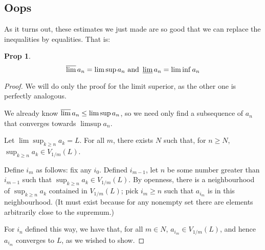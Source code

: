 \documentclass{article}
\newtheorem{prop}{Prop}
\theoremstyle{definition}
\begin{document}
	\subsection{Oops}
	
	As it turns out, these estimates we just made are so good that we can replace the inequalities by equalities. That is:
	
	\begin{prop}
	\[\varlimsup a_n = \limsup a_n \text{ and } \varliminf a_n = \liminf a_n\]
	\end{prop}
	
	\begin{proof}
	We will do only the proof for the limit superior, as the other one is perfectly analogous.
	
	We already know $\varlimsup a_n \leq \limsup a_n$, so we need only find a subsequence of $a_n$ that converges towards $\limsup a_n$.
	
	Let $\lim \sup_{k \geq n} a_k = L$. For all $m$, there exists $N$ such that, for $n \geq N$, $\sup_{k \geq n} a_k \in V_{1/m}(L)$.
	
	Define $i_m$ as follows: fix any $i_0$. Defined $i_{m-1}$, let $n$ be some number greater than $i_{m-1}$ such that $\sup_{k \geq n} a_k \in V_{1/m}(L)$. By openness, there is a neighbourhood of $\sup_{k \geq n} a_k$ contained in $V_{1/m}(L)$; pick $i_m \geq n$ such that $a_{i_m}$ is in this neighbourhood. (It must exist because for any nonempty set there are elements arbitrarily close to the supremum.)
	
	For $i_n$ defined this way, we have that, for all $m \in N$, $a_{i_m} \in V_{1/m}(L)$, and hence $a_{i_m}$ converges to $L$, as we wished to show.
	\end{proof}
	
	
\end{document}
